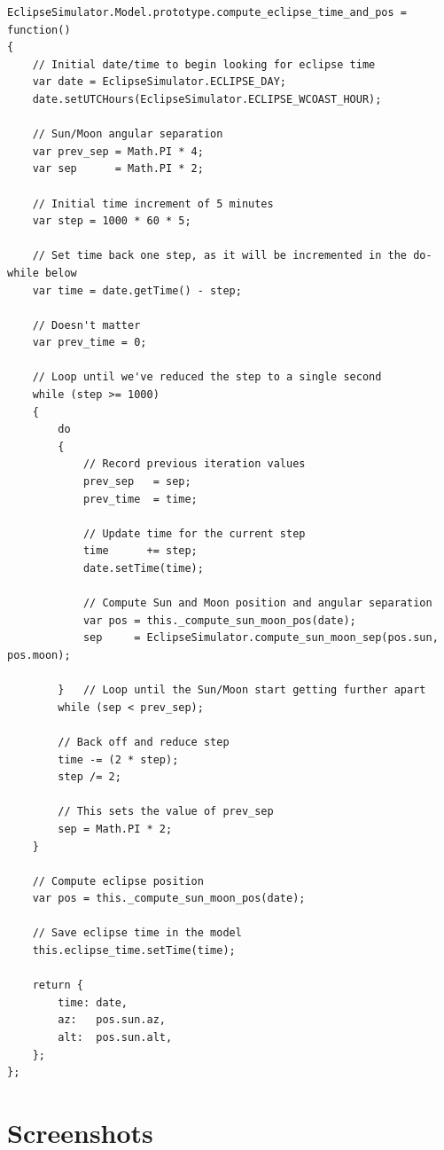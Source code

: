 \documentclass[10pt, onecolumn, draftclsnofoot, letterpaper, compsoc]{IEEEtran}
\begin{document}
\begin{verbatim}
EclipseSimulator.Model.prototype.compute_eclipse_time_and_pos = function()
{
    // Initial date/time to begin looking for eclipse time
    var date = EclipseSimulator.ECLIPSE_DAY;
    date.setUTCHours(EclipseSimulator.ECLIPSE_WCOAST_HOUR);

    // Sun/Moon angular separation
    var prev_sep = Math.PI * 4;
    var sep      = Math.PI * 2;

    // Initial time increment of 5 minutes
    var step = 1000 * 60 * 5;

    // Set time back one step, as it will be incremented in the do-while below
    var time = date.getTime() - step;

    // Doesn't matter
    var prev_time = 0;

    // Loop until we've reduced the step to a single second
    while (step >= 1000)
    {
        do
        {
            // Record previous iteration values
            prev_sep   = sep;
            prev_time  = time;

            // Update time for the current step
            time      += step;
            date.setTime(time);

            // Compute Sun and Moon position and angular separation
            var pos = this._compute_sun_moon_pos(date);
            sep     = EclipseSimulator.compute_sun_moon_sep(pos.sun, pos.moon);

        }	// Loop until the Sun/Moon start getting further apart
        while (sep < prev_sep);

        // Back off and reduce step
        time -= (2 * step);
        step /= 2;

        // This sets the value of prev_sep
        sep = Math.PI * 2;
    }

    // Compute eclipse position
    var pos = this._compute_sun_moon_pos(date);

    // Save eclipse time in the model
    this.eclipse_time.setTime(time);

    return {
        time: date,
        az:   pos.sun.az,
        alt:  pos.sun.alt,
    };
};
\end{verbatim}

\section{Screenshots}
\end{document}
